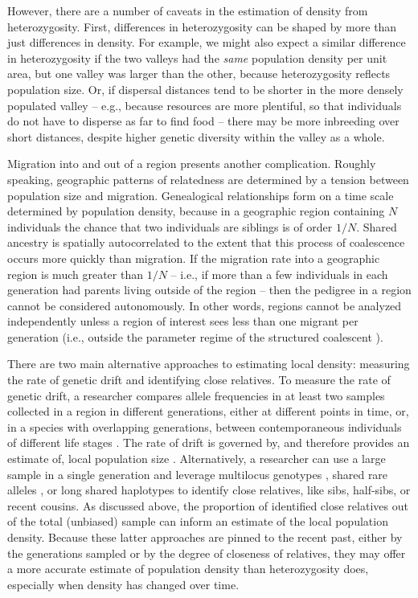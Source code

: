 \documentclass{ar-1col}
\newcommand{\g}[1]{{\color{blue}{#1}}}
\begin{document}
However, there are a number of caveats in the estimation 
of density from heterozygosity.
First, differences in heterozygosity can be shaped 
by more than just differences in density.
For example, we might also expect a similar difference in heterozygosity
if the two valleys had the \textit{same} population density per unit area,
but one valley was larger than the other,
because heterozygosity reflects population size.
Or, if dispersal distances tend to be shorter
in the more densely populated valley -- 
e.g., because resources are more plentiful, 
so that individuals do not have to disperse as far to find food -- 
there may be more inbreeding over short distances,
despite higher genetic diversity within the valley as a whole.

Migration into and out of a region presents another complication.
Roughly speaking,
geographic patterns of relatedness
are determined by a tension between population size and migration.
Genealogical relationships form on a time scale determined by population density,
because in a geographic region containing $N$ individuals
the chance that two individuals are siblings is of order $1/N$.
Shared ancestry is spatially autocorrelated
to the extent that this process of coalescence
occurs more quickly than migration.
If the migration rate into a geographic region is much greater than $1/N$ --
i.e., if more than a few individuals in each generation had parents living outside of the region --
then the pedigree in a region cannot be considered autonomously.
In other words,
regions cannot be analyzed independently
unless a region of interest sees less than one migrant per generation
(i.e., outside the parameter regime of the structured coalescent \citep{nagylaki1998}).

There are two main alternative approaches to estimating local density: 
measuring the rate of genetic drift  and identifying close relatives\citep{Wang2016Prediction}.
To measure the rate of genetic drift, 
a researcher compares allele frequencies
in at least two samples collected in a region in different generations, 
either at different points in time,
or, in a species with overlapping generations, 
between contemporaneous individuals of different life stages
\citep{WilliamsonSlatkin1999}.
The rate of drift is governed by, 
and therefore provides an estimate of, 
local population size
\citep{ewens2004mpg,Charlesworth2009}.
Alternatively, a researcher can use a large sample in a single generation 
and leverage multilocus genotypes \citep{nomura2008estimation,WaplesWaples2011,Wang_2014},
shared rare alleles \citep{NovembreSlatkin2009}, 
or long shared haplotypes \citep[e.g.,][]{ralph2013geography}
to identify close relatives, like sibs, half-sibs, or recent cousins.
As discussed above, the proportion of identified close relatives out of the total (unbiased)
sample can inform an estimate of the local population density.
Because these latter approaches are pinned to the recent past, 
either by the generations sampled or by the degree of closeness of relatives,
they may offer a more accurate estimate of population density than heterozygosity does, 
especially when density has changed over time.
\g{more on this and about how heterozygosity reflects historical avgs?}
\end{document}

